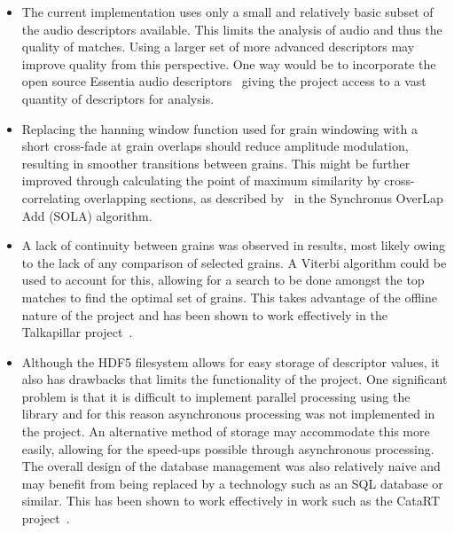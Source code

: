 \documentclass{scrartcl}
\begin{document}
    \begin{itemize}
        \item The current implementation uses only a small and relatively basic
            subset of the audio descriptors available. This limits the analysis
            of audio and thus the quality of matches. Using a larger set of
            more advanced descriptors may improve quality from this
            perspective. One way would be to incorporate the open source
            Essentia audio descriptors~\parencite{Essentia2016} giving the
            project access to a vast quantity of descriptors for analysis.

        \item Replacing the hanning window function used for grain windowing
            with a short cross-fade at grain overlaps should reduce amplitude
            modulation, resulting in smoother transitions between grains. This
            might be further improved through calculating the point of maximum
            similarity by cross-correlating overlapping sections, as described
            by~\textcite[p.191-193]{Zolzer2011} in the Synchronus OverLap Add
            (SOLA) algorithm.

        \item A lack of continuity between grains was observed in results, most
            likely owing to the lack of any comparison of selected grains. A
            Viterbi algorithm could be used to account for this, allowing for a
            search to be done amongst the top matches to find the optimal set
            of grains. This takes advantage of the offline nature of the
            project and has been shown to work effectively in the Talkapillar
            project~\parencite{Hueber}.

        \item Although the HDF5 filesystem allows for easy storage of
            descriptor values, it also has drawbacks that limits the
            functionality of the project. One significant problem is that it is
            difficult to implement parallel processing using the library and
            for this reason asynchronous processing was not implemented in the
            project. An alternative method of storage may accommodate this more
            easily, allowing for the speed-ups possible through asynchronous
            processing. The overall design of the database management was also
            relatively naive and may benefit from being replaced by a
            technology such as an SQL database or similar. This has been shown
            to work effectively in work such as the CataRT
            project~\parencite[p.3]{Schwarz2006a}.
    \end{itemize}
   
\end{document}
